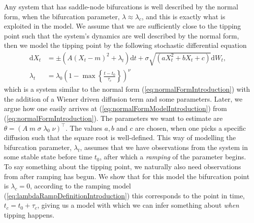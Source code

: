 Any system that has saddle-node bifurcations is well described by the normal form, when the bifurcation parameter, $\lambda\approx\lambda_c$, and this is exactly what is exploited in the model. We assume that we are sufficiently close to the tipping point such that the system's dynamics are well described by the normal form, then we model the tipping point by the following stochastic differential equation
\begin{align}
    \mathrm{d}X_t &= \pm(A(X_t - m)^2 + \lambda_t)\mathrm{d}t + \sigma\sqrt{\left(aX_t^2 + bX_t + c\right)}\mathrm{d}W_t, \label{eq:normalFormModelIntroduction}\\
    \lambda_t &= \lambda_0\left(1 - \max\left\{\frac{t - t_0}{\tau_c}\right\}\right)^\nu \label{eq:lambdaRampDefinitionIntroduction}
\end{align}
which is a system similar to the normal form (\ref{eq:normalFormIntroduction}) with the addition of a Wiener driven diffusion term and some parameters. Later, we argue how one easily arrives at (\ref{eq:normalFormModelIntroduction}) from (\ref{eq:normalFormIntroduction}). The parameters we want to estimate are $\theta = \left(A\; m\; \sigma\; \lambda_0\; \nu\right)^\top$. The values $a, b$ and $c$ are chosen, when one picks a specific diffusion such that the square root is well-defined. This way of modelling the bifurcation parameter, $\lambda_t$, assumes that we have observations from the system in some stable state before time $t_0$, after which a \textit{ramping} of the parameter begins. To say something about the tipping point, we naturally also need observations from after ramping has begun. We show that for this model the bifurcation point is $\lambda_c = 0$, according to the ramping model (\ref{eq:lambdaRampDefinitionIntroduction}) this corresponds to the point in time, $t_c = t_0 + \tau_c$, giving us a model with which we can infer something about \textit{when} tipping happens.

